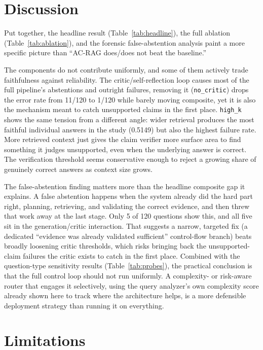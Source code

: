 \documentclass[conference]{IEEEtran}
\begin{document}
\section{Discussion}
\label{sec:discussion}

Put together, the headline result (Table~\ref{tab:headline}), the full ablation
(Table~\ref{tab:ablation}), and the forensic false-abstention analysis paint a more
specific picture than ``AC-RAG does/does not beat the baseline.''

The components do not contribute uniformly, and some of them actively trade
faithfulness against reliability. The critic/self-reflection loop causes most of the
full pipeline's abstentions and outright failures, removing it (\texttt{no\_critic})
drops the error rate from 11/120 to 1/120 while barely moving composite, yet it is also
the mechanism meant to catch unsupported claims in the first place. \texttt{high\_k}
shows the same tension from a different angle: wider retrieval produces the most
faithful individual answers in the study (0.5149) but also the highest failure rate.
More retrieved context just gives the claim verifier more surface area to find
something it judges unsupported, even when the underlying answer is correct. The
verification threshold seems conservative enough to reject a growing share of
genuinely correct answers as context size grows.

The false-abstention finding matters more than the headline composite gap it explains.
A false abstention happens when the system already did the hard part right, planning,
retrieving, and validating the correct evidence, and then threw that work away at the
last stage. Only 5 of 120 questions show this, and all five sit in the
generation/critic interaction. That suggests a narrow, targeted fix (a dedicated
``evidence was already validated sufficient'' control-flow branch) beats broadly
loosening critic thresholds, which risks bringing back the unsupported-claim failures
the critic exists to catch in the first place. Combined with the question-type
sensitivity results (Table~\ref{tab:probes}), the practical conclusion is that the full
control loop should not run uniformly. A complexity- or risk-aware router that engages
it selectively, using the query analyzer's own complexity score already shown here to
track where the architecture helps, is a more defensible deployment strategy than
running it on everything.

\section{Limitations}
\label{sec:limitations}
\end{document}
